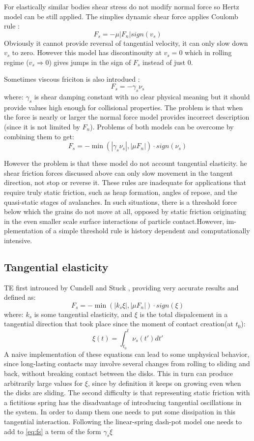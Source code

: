 \documentclass[10pt,a4paper]{article}
\begin{document}
For elastically similar bodies shear stress do not modify normal force so Hertz model can be still applied. 
The simplies dynamic shear force applies Coulomb rule \cite{haff86}:
\[
 F_s = -\mu |F_n| sign(v_s)
\]
Obviously it cannot provide reversal of tangential velocity, it can only slow down $v_s$ to zero.
However this model has discontinouity at $v_s = 0$ which in rolling regime ($v_s \Rightarrow 0$) gives jumps in the sign of 
$F_s$ instead of just 0.

Sometimes viscous friciton is also introdued \cite{sok92b}:
\[
 F_s = -\gamma_s \nu_s
\]
where: $\gamma_s$ is shear damping constant with no clear physical meaning but it should provide values high enough for collisional properties.
The problem is that when the force is nearly or larger the normal force
model provides incorrect description (since it is not limited by $F_n$).
Problems of both models can be overcome by combining them to get\cite{pb93, pb94, pb95}:
\[
 F_s = -\min(|\gamma_s \nu_s|,|\mu F_n|) \cdot sign(\nu_s)
\]

However the problem is that these model do not account tangential elasticity. 
he shear friction forces discussed above can only slow
movement in the tangent direction, not stop or reverse it.
These rules are inadequate for applications that require truly
static friction, such as heap formation, angles of repose, and
the quasi-static stages of avalanches. In such situations, there
is a threshold force below which the grains do not move at
all, opposed by static friction originating in the even smaller
scale surface interactions of particle contact.However, im-
plementation of a simple threshold rule is history dependent
and computationally intensive. 


\subsection{Tangential elasticity}
TE first introuced by Cundell and Stuck \cite{cs79}, providing very accurate results and defined as:
\begin{equation} \label{eq:fs}
 F_s = -\min(|k_s \xi|,|\mu F_n|) \cdot sign(\xi)
\end{equation}
where: $k_s$ is some tangential elasticity, and $\xi$ is the total dispalcement in a tangential direction that took place
since the moment of contact creation(at $t_0$):
\[
 \xi(t) = \int^{t}_{t_0} \nu_s(t')dt'
\]
A naive implementation of these equations can lead to some unphysical behavior,
since long-lasting contacts may involve several changes from rolling to sliding and
back, without breaking contact between the disks. This in turn can produce arbitrarily large values for $\xi$, 
since by definition it keeps on growing even when the
disks are sliding. 
The second difficulty is that representing static friction with a fictitious spring has the disadvantage 
of introducing tangential oscillations in the
system. In order to damp them one needs to put some dissipation in this tangential
interaction. Following the linear-spring dash-pot model one needs to add to \ref{eq:fs}
a term of the form $\gamma_s \dot{\xi}$
\end{document}
